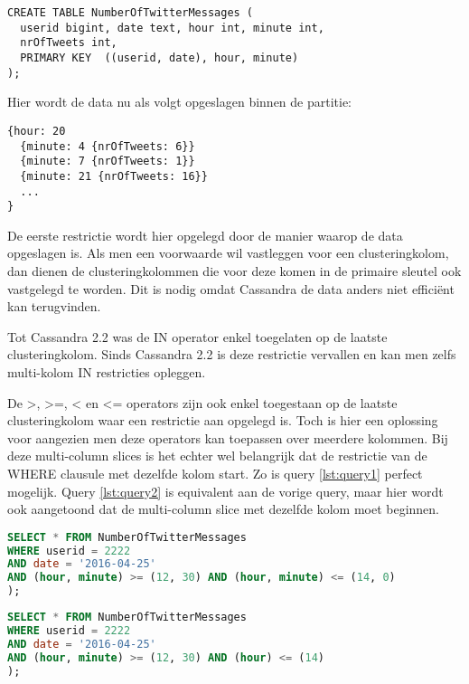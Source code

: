 \begin{lstlisting}[caption={Layout van de tabel NumberOfTwitterMessages}, label={lst:twitter_messages}]
CREATE TABLE NumberOfTwitterMessages (
  userid bigint, date text, hour int, minute int,
  nrOfTweets int,
  PRIMARY KEY  ((userid, date), hour, minute)
);

\end{lstlisting}

Hier wordt de data nu als volgt opgeslagen binnen de partitie: 

\begin{lstlisting}
{hour: 20 
  {minute: 4 {nrOfTweets: 6}} 
  {minute: 7 {nrOfTweets: 1}}
  {minute: 21 {nrOfTweets: 16}}
  ...
}
\end{lstlisting}

De eerste restrictie wordt hier opgelegd door de manier waarop de data opgeslagen is.
Als men een voorwaarde wil vastleggen voor een clusteringkolom, dan dienen de clusteringkolommen die voor deze komen in de primaire sleutel ook vastgelegd te worden.
Dit is nodig omdat Cassandra de data anders niet efficiënt kan terugvinden.

Tot Cassandra 2.2 was de IN operator enkel toegelaten op de laatste clusteringkolom.
Sinds Cassandra 2.2 is deze restrictie vervallen en kan men zelfs multi-kolom IN restricties opleggen.

De >, >=, < en <= operators zijn ook enkel toegestaan op de laatste clusteringkolom waar een restrictie aan opgelegd is.
Toch is hier een oplossing voor aangezien men deze operators kan toepassen over meerdere kolommen.
Bij deze multi-column slices is het echter wel belangrijk dat de restrictie van de WHERE clausule met dezelfde kolom start.
Zo is query \ref{lst:query1} perfect mogelijk.
Query \ref{lst:query2} is equivalent aan de vorige query, maar hier wordt ook aangetoond dat de multi-column slice met dezelfde kolom moet beginnen.


\begin{lstlisting}[caption={Multi-column slice restrictie}, label={lst:query1}, language=SQL]
SELECT * FROM NumberOfTwitterMessages
WHERE userid = 2222
AND date = '2016-04-25'
AND (hour, minute) >= (12, 30) AND (hour, minute) <= (14, 0)
);
\end{lstlisting}

\begin{lstlisting}[caption={De restrictie moet starten met dezelfde kolom}, label={lst:query2}, language=SQL]
SELECT * FROM NumberOfTwitterMessages
WHERE userid = 2222
AND date = '2016-04-25'
AND (hour, minute) >= (12, 30) AND (hour) <= (14)
);
\end{lstlisting}

